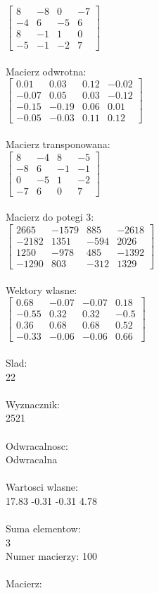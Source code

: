 \documentclass[a4paper,12pt]{article}
\begin{document}
$\begin{bmatrix} 8&-8&0&-7\\-4&6&-5&6\\8&-1&1&0\\-5&-1&-2&7 \end{bmatrix}$
\\
\\
Macierz odwrotna:\\

$\begin{bmatrix} 0.01&0.03&0.12&-0.02\\-0.07&0.05&0.03&-0.12\\-0.15&-0.19&0.06&0.01\\-0.05&-0.03&0.11&0.12 \end{bmatrix}$
\\
\\
Macierz transponowana:\\

$\begin{bmatrix} 8&-4&8&-5\\-8&6&-1&-1\\0&-5&1&-2\\-7&6&0&7 \end{bmatrix}$
\\
\\
Macierz do potegi 3:\\

$\begin{bmatrix} 2665&-1579&885&-2618\\-2182&1351&-594&2026\\1250&-978&485&-1392\\-1290&803&-312&1329 \end{bmatrix}$
\\
\\
Wektory wlasne:\\

$\begin{bmatrix} 0.68&-0.07&-0.07&0.18\\-0.55&0.32&0.32&-0.5\\0.36&0.68&0.68&0.52\\-0.33&-0.06&-0.06&0.66 \end{bmatrix}$
\\
\\
Slad:\\
22
\\
\\
Wyznacznik:\\
2521
\\
\\
Odwracalnosc:\\
Odwracalna
\\
\\
Wartosci wlasne:\\
17.83 -0.31 -0.31 4.78
\\
\\
Suma elementow:\\
3
\\
\newpage
Numer macierzy:
100
\\
\\
Macierz:\\
\end{document}
